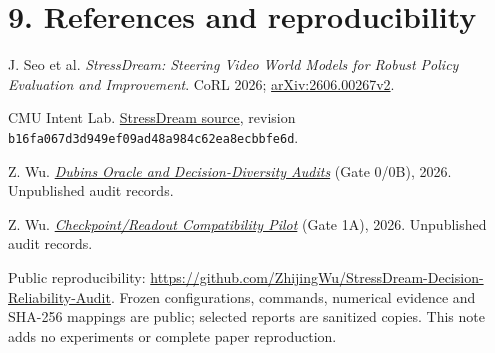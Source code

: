 \documentclass[letterpaper,10pt]{article}
\begin{document}
\section*{9. References and reproducibility}
\begingroup\fontsize{9.2}{10.5}\selectfont\setlength{\parskip}{1pt}
\noindent[1] J. Seo et al. \emph{StressDream: Steering Video World Models for Robust Policy Evaluation and Improvement}. CoRL 2026; \href{https://arxiv.org/abs/2606.00267v2}{arXiv:2606.00267v2}.\par
\noindent[2] CMU Intent Lab. \href{https://github.com/CMU-IntentLab/StressDream/tree/b16fa067d3d949ef09ad48a984c62ea8ecbbfe6d}{StressDream source}, revision \texttt{b16fa067d3d949ef09ad48a984c62ea8ecbbfe6d}.\par
\noindent[3] Z. Wu. \href{https://github.com/ZhijingWu/StressDream-Decision-Reliability-Audit/tree/main/experiments}{\emph{Dubins Oracle and Decision-Diversity Audits}} (Gate 0/0B), 2026. Unpublished audit records.\par
\noindent[4] Z. Wu. \href{https://github.com/ZhijingWu/StressDream-Decision-Reliability-Audit/tree/main/experiments/gate1a}{\emph{Checkpoint/Readout Compatibility Pilot}} (Gate 1A), 2026. Unpublished audit records.\par
Public reproducibility: \url{https://github.com/ZhijingWu/StressDream-Decision-Reliability-Audit}. Frozen configurations, commands, numerical evidence and SHA-256 mappings are public; selected reports are sanitized copies. This note adds no experiments or complete paper reproduction.
\endgroup
\end{document}
